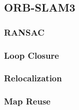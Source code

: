 \subsection{ORB-SLAM3}

\subsubsection{RANSAC}
\subsubsection{Loop Closure}
\subsubsection{Relocalization}
\subsubsection{Map Reuse}
